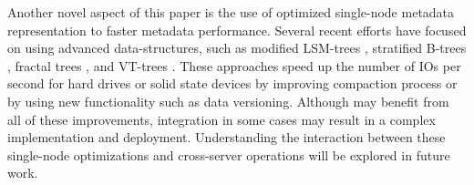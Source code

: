 Another novel aspect of this paper is the use of optimized single-node metadata
representation to faster metadata performance.
Several recent efforts have focused on using advanced data-structures, such
as modified LSM-trees \cite{blsm}, stratified B-trees \cite{Andrew11},
fractal trees \cite{tokufs}, and VT-trees \cite{VTtree}.
These approaches speed up the number of IOs per second for hard drives or solid 
state devices by improving compaction process or by using new functionality
such as data versioning. Although \tfs may benefit from all of these 
improvements, \giga integration in some cases may result in a complex
implementation and deployment.
Understanding the interaction between these single-node \tfs optimizations and 
cross-server operations will be explored in future work. 

